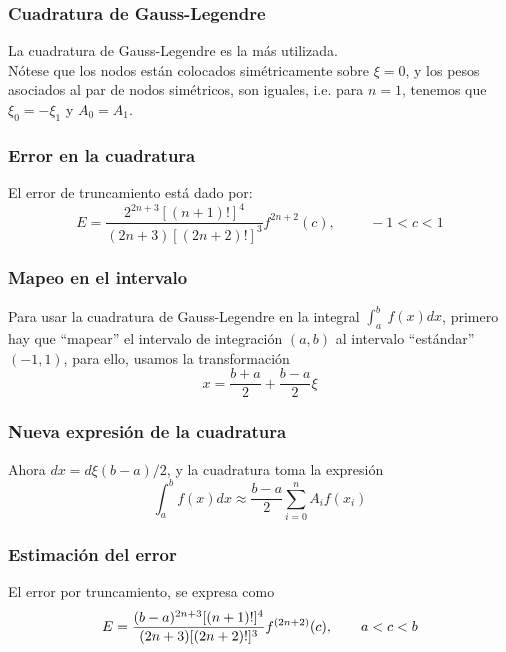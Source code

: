 \begin{frame}
\frametitle{Cuadratura de Gauss-Legendre}
La cuadratura de Gauss-Legendre es la más utilizada. 
\\
\bigskip
Nótese que los nodos están colocados simétricamente sobre $\xi=0$, y los pesos asociados al par de nodos simétricos, son iguales, i.e. para $n=1$, tenemos que $\xi_{0} = - \xi_{1}$ y $A_{0} = A_{1}$.
\end{frame}
\begin{frame}
\frametitle{Error en la cuadratura}
El error de truncamiento está dado por:
\[ E = \dfrac{2^{2n+3} [(n+1)!]^{4}}{(2n+3)[(2n+2)!]^{3}} f^{2n+2} (c), \hspace{1cm} -1 < c < 1 \]
\end{frame}
\begin{frame}
\frametitle{Mapeo en el intervalo}
Para usar la cuadratura de Gauss-Legendre en la integral $\int_{a}^{b} \: f(x) dx$, primero hay que \enquote{mapear} el intervalo de integración $(a,b)$ al intervalo \enquote{estándar} $(-1, 1)$, para ello, usamos la transformación
\[ x = \dfrac{b + a}{2} + \dfrac{b - a}{2} \xi \]
\end{frame}
\begin{frame}
\frametitle{Nueva expresión de la cuadratura}
Ahora $dx = d \xi (b-a)/2$, y la cuadratura toma la expresión
\[ \int_{a}^{b} f(x) dx \approx \dfrac{b-a}{2} \sum_{i=0}^{n} A_{i} f(x_{i}) \]
\end{frame}
\begin{frame}
\frametitle{Estimación del error}
El error por truncamiento, se expresa como
\[ E = \dfrac{(b-a)^{2n+3} [(n+1)!]^{4}}{(2n+3)[(2n+2)!]^{3}} f^{(2n+2)} (c), \hspace{0.7cm} a<c<b \]
\end{frame}
